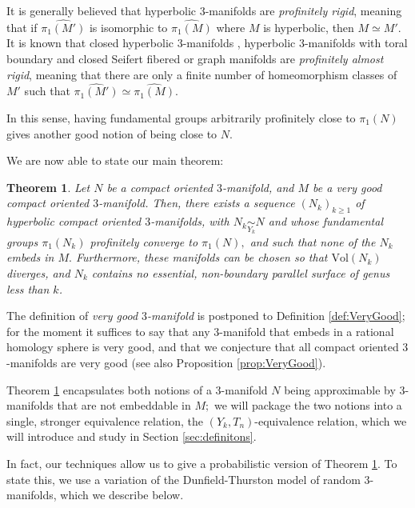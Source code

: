 \documentclass[12pt]{amsart}
\newtheorem{thm}{Theorem}[section]
\theoremstyle{definition}
\begin{document}
It is generally believed that hyperbolic $3$-manifolds are \emph{profinitely rigid}, meaning that if $\widehat{\pi_1(M')}$ is isomorphic to $\widehat{\pi_1(M)}$ where $M$ is hyperbolic, then $M\simeq M'.$ It is known that closed hyperbolic $3$-manifolds \cite{Liu23}, hyperbolic $3$-manifolds with toral boundary \cite{Xu25} and closed Seifert fibered or graph manifolds \cite{Wil1,Wil2,Wil3} are \emph{profinitely almost rigid}, meaning that there are only a finite number of homeomorphism classes of $M'$ such that $\widehat{\pi_1(M')}\simeq \widehat{\pi_1(M)}.$

In this sense, having fundamental groups arbitrarily profinitely close to $\pi_1(N)$ gives another good notion of being close to $N.$

We are now able to state our main theorem:

\begin{thm}
	\label{thm:intro1} Let $N$ be a compact oriented $3$-manifold, and $M$ be a very good compact oriented $3$-manifold. Then, there exists a sequence $(N_k)_{k\geq 1}$ of hyperbolic compact oriented $3$-manifolds, with $N_k \underset{Y_k}{\sim} N$ and whose fundamental groups $\pi_1(N_k)$ profinitely converge to $\pi_1(N),$ and such that none of the $N_k$ embeds in $M.$ Furthermore, these manifolds can be chosen so that $\textrm{Vol}(N_k)$ diverges, and $N_k$ contains no essential, non-boundary parallel surface of genus less than $k$.
\end{thm}
The definition of \emph{very good $3$-manifold} is postponed to Definition \ref{def:VeryGood}; for the moment it suffices to say that any $3$-manifold that embeds in a rational homology sphere is very good, and that we conjecture that all compact oriented $3$-manifolds are very good (see also Proposition \ref{prop:VeryGood}).

Theorem \ref{thm:intro1} encapsulates both notions of a $3$-manifold $N$ being approximable by $3$-manifolds that are not embeddable in $M;$ we will package the two notions into a single, stronger equivalence relation, the $(Y_k,T_n)$-equivalence relation, which we will introduce and study in Section \ref{sec:definitons}. 

In fact, our techniques allow us to give a probabilistic version of Theorem \ref{thm:intro1}.%
To state this, we use a variation of the Dunfield-Thurston \cite{DT06} model of random $3$-manifolds, which we describe below.
\end{document}
